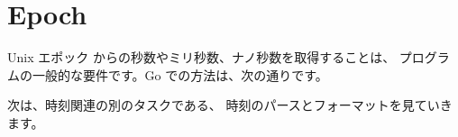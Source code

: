 \section{Epoch}

Unix エポック からの秒数やミリ秒数、ナノ秒数を取得することは、 プログラムの一般的な要件です。Go での方法は、次の通りです。




次は、時刻関連の別のタスクである、 時刻のパースとフォーマットを見ていきます。
